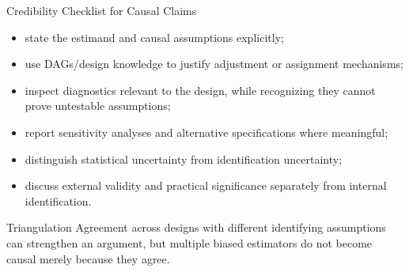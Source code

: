 \documentclass[aspectratio=169,11pt]{beamer}
\begin{document}
\begin{frame}{Credibility Checklist for Causal Claims}
\begin{itemize}
  \item state the estimand and causal assumptions explicitly;
  \item use DAGs/design knowledge to justify adjustment or assignment mechanisms;
  \item inspect diagnostics relevant to the design, while recognizing they cannot prove untestable assumptions;
  \item report sensitivity analyses and alternative specifications where meaningful;
  \item distinguish statistical uncertainty from identification uncertainty;
  \item discuss external validity and practical significance separately from internal identification.
\end{itemize}

\begin{block}{Triangulation}
Agreement across designs with different identifying assumptions can strengthen an argument, but multiple biased estimators do not become causal merely because they agree.
\end{block}
\end{frame}
\end{document}
